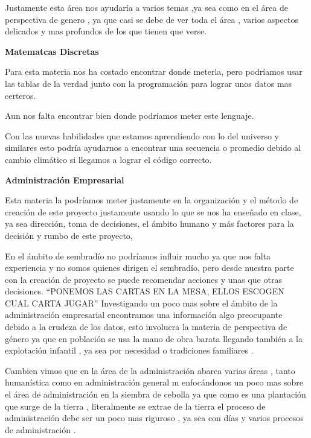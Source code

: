 \documentclass[12pt]{article}
\begin{document}
{{{{{		Justamente esta área nos ayudaría a varios temas ,ya sea como en el área de perspectiva de genero , ya que casi se debe de ver toda el área , varios aspectos delicados y mas profundos de los que tienen que verse.
			\newpage
		\begin{center}
			{\huge \textbf{Matematcas Discretas}}
		\end{center}
		\vspace{1cm} 
		{\large %
			Para esta materia nos ha costado encontrar donde meterla, pero podríamos usar las tablas de la verdad junto con la programación para lograr  unos datos mas certeros. 
			
			Aun nos falta encontrar bien donde podríamos meter este lenguaje.
			
			Con las nuevas habilidades que estamos aprendiendo con lo del universo y similares esto podría ayudarnos a encontrar una secuencia o promedio debido al cambio climático si llegamos a lograr el código correcto.
			
		\newpage
	\begin{center}
		{\huge \textbf{Administración Empresarial}}
	\end{center}
	\vspace{1cm} 
	{\large %
			Esta materia la podríamos meter justamente en la organización y el método de creación de este proyecto justamente usando lo que se nos ha enseñado en clase, ya sea dirección, toma de decisiones, el ámbito humano y más factores para la decisión y rumbo de este proyecto,
			
			En el ámbito de sembradío no podríamos influir mucho ya que nos falta experiencia y no somos quienes dirigen el sembradío, pero desde nuestra parte con la creación de proyecto se puede recomendar acciones y unas que otras decisiones.
			“PONEMOS LAS CARTAS EN LA MESA, ELLOS ESCOGEN CUAL CARTA JUGAR”
			Investigando un poco mas sobre el ámbito de la administración empresarial encontramos una información algo preocupante debido a la crudeza de los datos, esto involucra la materia de perspectiva de género ya que en población se usa la mano de obra barata llegando también a la explotación infantil , ya sea por necesidad o  tradiciones familiares .
			
			Cambien vimos que en la área de la administración abarca varias áreas , tanto humanística  como en administración general m enfocándonos un poco mas sobre el área de administración en la siembra de cebolla ya que como es una plantación que surge de la tierra , literalmente se extrae de la tierra el proceso de administración debe ser un poco mas riguroso , ya sea con días y varios procesos de administración .
			
}}}}}}}
\end{document}
